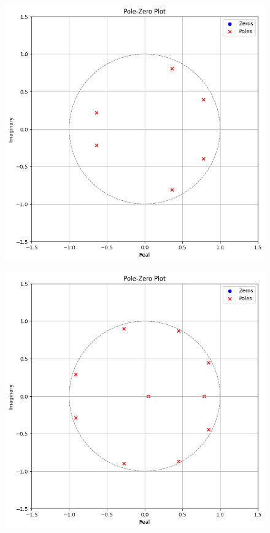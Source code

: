 \documentclass{article}
\begin{document}
\begin{figure}[H]
\begin{center}
\includegraphics[scale = 0.8]{p6.png}
\end{center}
\end{figure}

\begin{figure}[H]
\begin{center}
\includegraphics[scale = 0.8]{p10.png}
\end{center}
\end{figure}
\end{document}

